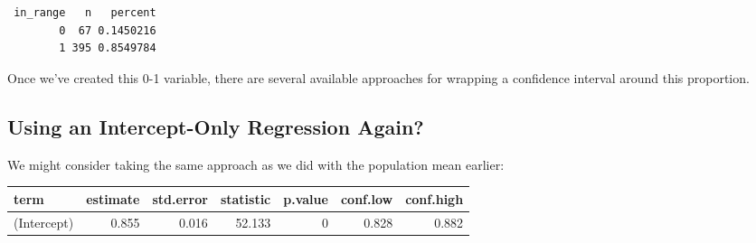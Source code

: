 \documentclass[
]{book}
\newenvironment{Shaded}{\begin{snugshade}}{\end{snugshade}}
\newcommand{\DataTypeTok}[1]{\textcolor[rgb]{0.13,0.29,0.53}{#1}}
\newcommand{\DecValTok}[1]{\textcolor[rgb]{0.00,0.00,0.81}{#1}}
\newcommand{\FloatTok}[1]{\textcolor[rgb]{0.00,0.00,0.81}{#1}}
\newcommand{\KeywordTok}[1]{\textcolor[rgb]{0.13,0.29,0.53}{\textbf{#1}}}
\newcommand{\NormalTok}[1]{#1}
\newcommand{\OperatorTok}[1]{\textcolor[rgb]{0.81,0.36,0.00}{\textbf{#1}}}
\newcommand{\OtherTok}[1]{\textcolor[rgb]{0.56,0.35,0.01}{#1}}
\newcommand{\StringTok}[1]{\textcolor[rgb]{0.31,0.60,0.02}{#1}}
\begin{document}
\begin{Shaded}
\end{Shaded}

\begin{verbatim}
 in_range   n   percent
        0  67 0.1450216
        1 395 0.8549784
\end{verbatim}

Once we've created this 0-1 variable, there are several available approaches for wrapping a confidence interval around this proportion.

\hypertarget{using-an-intercept-only-regression-again}{%
\subsection{Using an Intercept-Only Regression Again?}\label{using-an-intercept-only-regression-again}}

We might consider taking the same approach as we did with the population mean earlier:

\begin{Shaded}
\end{Shaded}

\begin{tabular}{l|r|r|r|r|r|r}
\hline
term & estimate & std.error & statistic & p.value & conf.low & conf.high\\
\hline
(Intercept) & 0.855 & 0.016 & 52.133 & 0 & 0.828 & 0.882\\
\hline
\end{tabular}
\end{document}

